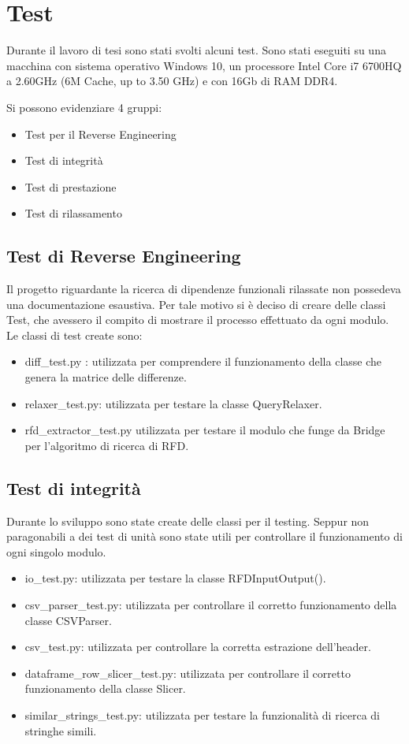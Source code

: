 \section{Test}
Durante il lavoro di tesi sono stati svolti alcuni test. 
Sono stati eseguiti su una macchina con sistema operativo Windows 10, un processore Intel Core i7 6700HQ a 2.60GHz (6M Cache, up to 3.50 GHz) e con 16Gb di RAM DDR4.

Si possono evidenziare 4 gruppi:
\begin{itemize}
    \item Test per il Reverse Engineering
    \item Test di integrità 
    \item Test di prestazione
    \item Test di rilassamento
\end{itemize}

\subsection{Test di Reverse Engineering}
Il progetto riguardante la ricerca di dipendenze funzionali rilassate non possedeva una documentazione esaustiva. Per tale motivo si è deciso di creare delle classi Test, che avessero il compito di mostrare il processo effettuato da ogni modulo.
Le classi di test create sono:
\begin{itemize}[noitemsep]
\let\labelitemi\labelitemii
    \item diff{\_}test.py : utilizzata per comprendere il funzionamento della classe che genera la matrice delle differenze.
    \item relaxer{\_}test.py: utilizzata per testare la classe QueryRelaxer.
    \item rfd{\_}extractor{\_}test.py utilizzata per testare il modulo che funge da Bridge per l'algoritmo di ricerca di RFD.
\end{itemize}

\subsection{Test di integrità}
Durante lo sviluppo sono state create delle classi per il testing. Seppur non paragonabili a dei test di unità sono state utili per controllare il funzionamento di ogni singolo modulo.
\begin{itemize}[noitemsep]
\let\labelitemi\labelitemii
    \item io{\_}test.py: utilizzata per testare la classe RFDInputOutput().
    \item csv{\_}parser{\_}test.py: utilizzata per controllare il corretto funzionamento della classe CSVParser. 
    \item csv{\_}test.py: utilizzata per controllare la corretta estrazione dell'header.
    \item dataframe{\_}row{\_}slicer{\_}test.py: utilizzata per controllare il corretto funzionamento della classe Slicer.
    \item similar{\_}strings{\_}test.py: utilizzata per testare la funzionalità di ricerca di stringhe simili.
\end{itemize}
